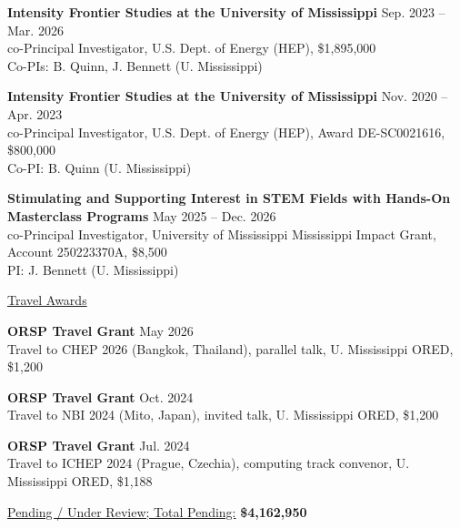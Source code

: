 \documentclass[margin, line]{res}
\renewcommand{\em}{\upshape\sffamily}
\begin{document}
\begin{resume}
{\bf Intensity Frontier Studies at the University of Mississippi} \hfill {Sep. 2023 -- Mar. 2026}\\
{\em co-Principal Investigator}, U.S. Dept. of Energy (HEP), \$1,895,000\\
{\em Co-PIs: B. Quinn, J. Bennett (U. Mississippi)}\\
\vspace{-.3cm}

{\bf Intensity Frontier Studies at the University of Mississippi} \hfill {Nov. 2020 -- Apr. 2023}\\
{\em co-Principal Investigator}, U.S. Dept. of Energy (HEP), Award DE-SC0021616, \$800,000\\
{\em Co-PI: B. Quinn (U. Mississippi)}\\
\vspace{-.3cm}

{\bf Stimulating and Supporting Interest in STEM Fields with Hands-On Masterclass Programs} \hfill {May 2025 -- Dec. 2026}\\
{\em co-Principal Investigator}, University of Mississippi Mississippi Impact Grant, Account 250223370A, \$8,500\\
{\em PI: J. Bennett (U. Mississippi)}\\
\vspace{-.3cm}

\vspace{0.1in}
\underline{\em Travel Awards}

{\bf ORSP Travel Grant} \hfill {May 2026}\\
{\em Travel to CHEP 2026 (Bangkok, Thailand), parallel talk}, U. Mississippi ORED, \$1,200\\
\vspace{-.3cm}

{\bf ORSP Travel Grant} \hfill {Oct. 2024}\\
{\em Travel to NBI 2024 (Mito, Japan), invited talk}, U. Mississippi ORED, \$1,200\\
\vspace{-.3cm}

{\bf ORSP Travel Grant} \hfill {Jul. 2024}\\
{\em Travel to ICHEP 2024 (Prague, Czechia), computing track convenor}, U. Mississippi ORED, \$1,188\\
\vspace{-.3cm}

\vspace{0.1in}
\underline{\em Pending / Under Review; Total Pending:} \textbf{\$4,162,950}


\end{resume}
\end{document}
